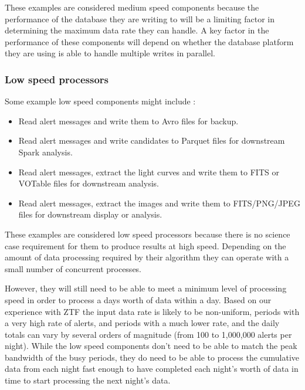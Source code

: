 \documentclass{article}
\newcommand{\avro} {Avro\xspace}
\newcommand{\fits} {FITS\xspace}
\newcommand{\parquet} {Parquet\xspace}
\newcommand{\votable} {VOTable\xspace}
\newcommand{\spark} {Spark\xspace}
\newcommand{\cassandra} {Cassandra\xspace}
\newcommand{\phasea} {phase-A\xspace}
\newcommand{\ztf} {ZTF\xspace}
\newcommand{\lsstuk} {LSST:UK\xspace}
\begin{document}
These examples are considered medium speed components because the performance of the database they are writing to will be a limiting factor in determining the maximum data rate they can handle. A key factor in the performance of these components will depend on whether the database platform they are using is able to handle multiple writes in parallel.


\subsubsection{Low speed processors}
\label{stage-2.low-speed.processors}

Some example low speed components might include :
\begin{itemize}
  \item Read alert messages and write them to \avro files for backup.
  \item Read alert messages and write candidates to \parquet files for downstream \spark analysis.
  \item Read alert messages, extract the light curves and write them to \fits or \votable files for downstream analysis.
  \item Read alert messages, extract the images and write them to FITS/PNG/JPEG files for downstream display or analysis.
\end{itemize}

These examples are considered low speed processors because there is no science case requirement for them to produce results at high speed. Depending on the amount of data processing required by their algorithm they can operate with a small number of concurrent processes.

However, they will still need to be able to meet a minimum level of processing speed in order to process a days worth of data within a day. Based on our experience with \ztf the input data rate is likely to be non-uniform, periods with a very high rate of alerts, and periods with a much lower rate, and the daily totals can vary by several orders of magnitude (from 100 to 1,000,000 alerts per night).
While the low speed components don't need to be able to match the peak bandwidth of the busy periods, they do need to be able to process the cumulative data from each night fast enough to have completed each night's worth of data in time to start processing the next night's data.
\end{document}
